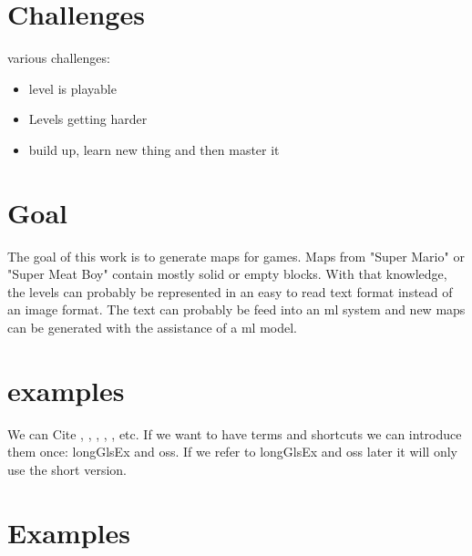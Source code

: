 \documentclass[10pt,a4paper]{article}
\begin{document}
\section{Challenges}
various challenges:
\begin{itemize}
\item level is playable
\item Levels getting harder
\item build up, learn new thing and then master it
\end{itemize}


\section{Goal}
The goal of this work is to generate maps for games. Maps from "Super Mario" or "Super Meat Boy" contain mostly solid or empty blocks. With that knowledge, the levels can probably be represented in an easy to read text format instead of an image format. The text can probably be feed into an \gls{ml} system and new maps can be generated with the assistance of a \gls{ml} model.

\section{examples}

We can Cite \cite{wikipediaScriptingLanguage}, \cite{Iivari2008usabilityInCompanyOSS}, \cite{almarzouq2005open}, \cite{heiseonline2017limuxservus}, \cite{viorres2007major}, \cite{wikipediaScriptingLanguage} etc. If we want to have terms and shortcuts we can introduce them once: \gls{longGlsEx} and \gls{oss}. If we refer to \gls{longGlsEx} and \gls{oss} later it will only use the short version.

\newpage
\newpage

\section{Examples}
\end{document}

